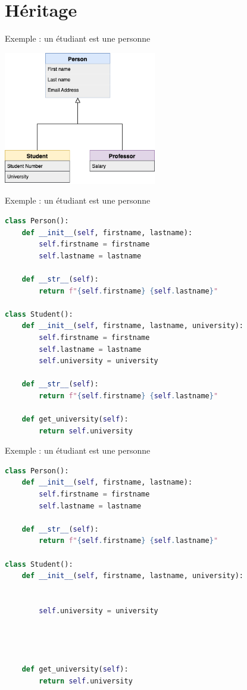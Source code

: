 \documentclass[10pt]{beamer}
\begin{document}
\section{Héritage}

\begin{frame}{Exemple : un étudiant est une personne}
  \begin{center}
    \includegraphics[width=0.5\textwidth]{img/heritage.png}
  \end{center}
\end{frame}

\begin{frame}[fragile]{Exemple : un étudiant est une personne}
\begin{lstlisting}[language=python, numbers=none]
class Person():
    def __init__(self, firstname, lastname):
        self.firstname = firstname
        self.lastname = lastname

    def __str__(self):
        return f"{self.firstname} {self.lastname}"

class Student():
    def __init__(self, firstname, lastname, university):
        self.firstname = firstname
        self.lastname = lastname
        self.university = university        

    def __str__(self):
        return f"{self.firstname} {self.lastname}"
    
    def get_university(self):
        return self.university
\end{lstlisting}
\end{frame}

\begin{frame}[fragile]{Exemple : un étudiant est une personne}
\begin{lstlisting}[language=python, numbers=none]
class Person():
    def __init__(self, firstname, lastname):
        self.firstname = firstname
        self.lastname = lastname

    def __str__(self):
        return f"{self.firstname} {self.lastname}"

class Student():
    def __init__(self, firstname, lastname, university):


        self.university = university        
    



    def get_university(self):
        return self.university
\end{lstlisting}
  \end{frame}
\end{document}
